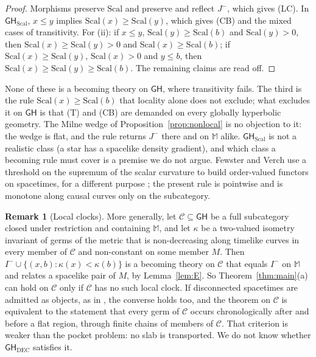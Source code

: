 \documentclass[11pt]{article}
\theoremstyle{definition}
\newtheorem{remark}[theorem]{Remark}
\newcommand{\GH}{\mathsf{GH}}
\newcommand{\Mink}{\mathbb M}
\newcommand{\Ichr}{I^{-}}
\newcommand{\Jm}{J^{-}}
\begin{document}
\begin{proof}
Morphisms preserve $\mathrm{Scal}$ and preserve and reflect $\Jm$, which gives (LC). In
$\GH_{\mathrm{Scal}}$, $x\le y$ implies $\mathrm{Scal}(x)\ge \mathrm{Scal}(y)$, which gives (CB) and the mixed cases
of transitivity. For (ii): if $x\le y$, $\mathrm{Scal}(y)\ge \mathrm{Scal}(b)$ and $\mathrm{Scal}(y)>0$, then
$\mathrm{Scal}(x)\ge \mathrm{Scal}(y)>0$ and $\mathrm{Scal}(x)\ge \mathrm{Scal}(b)$; if $\mathrm{Scal}(x)\ge \mathrm{Scal}(y)$, $\mathrm{Scal}(x)>0$ and $y\le b$,
then $\mathrm{Scal}(x)\ge \mathrm{Scal}(y)\ge \mathrm{Scal}(b)$. The remaining claims are read off.
\end{proof}

None of these is a becoming theory on $\GH$, where transitivity fails. The
third is the rule $\mathrm{Scal}(x)\ge \mathrm{Scal}(b)$ that locality alone does not exclude; what
excludes it on $\GH$ is that (T) and (CB) are demanded on every globally
hyperbolic geometry. The Milne wedge of Proposition~\ref{prop:nonlocal} is no
objection to it: the wedge is flat, and the rule returns $\Jm$ there and on
$\Mink$ alike. $\GH_{\mathrm{Scal}}$ is not a realistic class (a star has a spacelike
density gradient), and which class a becoming rule must cover is a premise we
do not argue. Fewster and Verch use a threshold on the supremum of the scalar
curvature to build order-valued functors on spacetimes, for a different purpose
\citep[\S4.3]{FV2012}; the present rule is pointwise and is monotone along causal
curves only on the subcategory.

\begin{remark}[Local clocks]\label{rem:clock}
More generally, let $\mathcal C\subseteq\GH$ be a full subcategory closed
under restriction and containing $\Mink$, and let $\kappa$ be a two-valued
isometry invariant of germs of the metric that is non-decreasing along
timelike curves in every member of $\mathcal C$ and non-constant on some
member $M$. Then $\Ichr\cup\{(x,b):\kappa(x)<\kappa(b)\}$ is a becoming theory
on $\mathcal C$ that equals $\Ichr$ on $\Mink$ and relates a spacelike pair of
$M$, by Lemma~\ref{lem:E}. So Theorem~\ref{thm:main}(a) can hold on
$\mathcal C$ only if $\mathcal C$ has no such local clock. If disconnected
spacetimes are admitted as objects, as in \citep[\S\S2.1--2.2]{FV2012}, the converse
holds too, and the theorem on $\mathcal C$ is equivalent to the statement that
every germ of $\mathcal C$ occurs chronologically after and before a flat
region, through finite chains of members of $\mathcal C$. That criterion is
weaker than the pocket problem: no slab is transported. We do not know whether
$\GH_{\mathrm{DEC}}$ satisfies it.
\end{remark}
\end{document}

